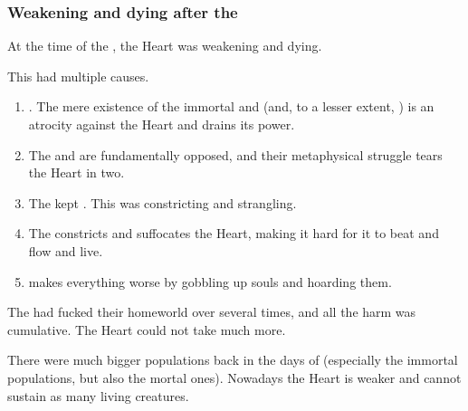 \subsubsection{Weakening and dying after the \secondbanewar}
At the time of the \thirdbanewar, the Heart was weakening and dying. 

This had multiple causes.

\begin{enumerate}
  \item 
    . 
    The mere existence of the immortal and  \resphain{} (and, to a lesser extent, \dragons) is an atrocity against the Heart and drains its power. 
    
  \item 
    The \draconic{} and \resphan{}  are fundamentally opposed, and their metaphysical struggle tears the Heart in two. 
    
  \item 
    The  kept \Miith{} . 
    This was constricting and strangling. 
    
  \item 
    The  constricts and suffocates the Heart, making it hard for it to beat and flow and live. 
    
  \item 
     makes everything worse by gobbling up souls and hoarding them. 
\end{enumerate}

The \Miithians had fucked their homeworld over several times, and all the harm was cumulative. 
The Heart could not take much more. 

There were much bigger populations back in the days of  (especially the immortal populations, but also the mortal ones). 
Nowadays the Heart is weaker and cannot sustain as many living creatures. 


